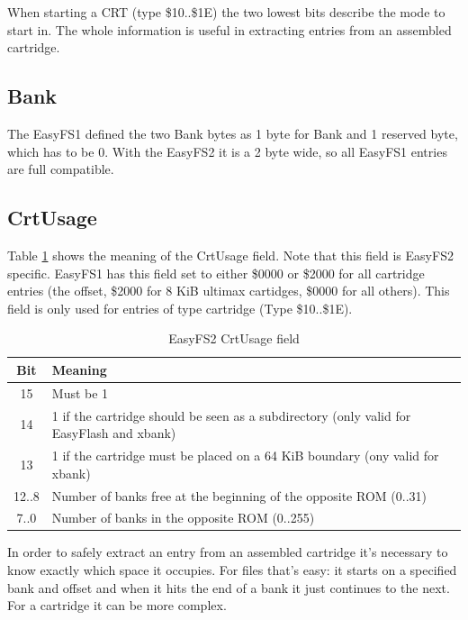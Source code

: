 \documentclass[a4paper,oneside]{memoir}
\begin{document}
When starting a CRT (type \$10..\$1E) the two lowest bits describe the
mode to start in. The whole information is useful in extracting entries
from an assembled cartridge.


\subsection{Bank}

The EasyFS1 defined the two Bank bytes as 1 byte for Bank and 1 reserved byte, which has to be 0.
With the EasyFS2 it is a 2 byte wide, so all EasyFS1 entries are full compatible.


\subsection{CrtUsage}

Table \ref{tab:easyfs-crtusage} shows the meaning of the CrtUsage field.
Note that this field is EasyFS2 specific. EasyFS1 has this field set to either \$0000 or \$2000
for all cartridge entries (the offset, \$2000 for 8 KiB ultimax cartidges, \$0000 for all others).
This field is only used for entries of type cartridge (Type \$10..\$1E).

\begin{table}[!htbp]
    \centering
    \begin{tabularx}{\textwidth}{ cX }
        \toprule
        Bit & Meaning \\
        \midrule
        15      & Must be 1 \\[3pt]
        14      & 1 if the cartridge should be seen as a subdirectory
                  (only valid for EasyFlash and xbank) \\[3pt]
        13      & 1 if the cartridge must be placed on a 64 KiB boundary
                  (ony valid for xbank) \\[3pt]
        12..8   & Number of banks free at the beginning of the opposite ROM
                  (0..31) \\[3pt]
        7..0    & Number of banks in the opposite ROM
                  (0..255) \\[3pt]
        \bottomrule
    \end{tabularx}
    \caption{EasyFS2 CrtUsage field}
    \label{tab:easyfs-crtusage}
\end{table}

In order to safely extract an entry from an assembled cartridge it's
necessary to know exactly which space it occupies. For files that's easy:
it starts on a specified bank and offset and when it hits the end of a bank
it just continues to the next. For a cartridge it can be more complex.
\end{document}
